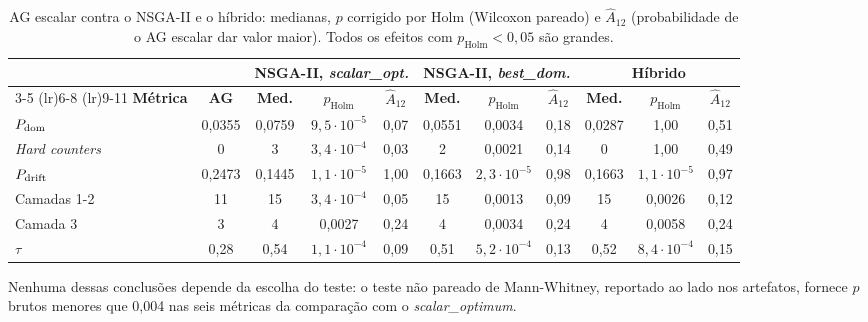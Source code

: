 \begin{table}[htb]
    \caption[AG escalar contra o NSGA-II e o híbrido]{AG escalar contra o NSGA-II e o híbrido: medianas, $p$ corrigido por Holm (Wilcoxon pareado) e $\hat{A}_{12}$ (probabilidade de o AG escalar dar valor maior). Todos os efeitos com $p_{\mathrm{Holm}} < 0{,}05$ são grandes.}
    \label{tab: comparacoes}
    \centering
    \footnotesize
    \setlength{\tabcolsep}{4pt}
    \begin{tabular}{l c ccc ccc ccc}
        \toprule
        & & \multicolumn{3}{c}{\textbf{NSGA-II, \textit{scalar\_opt.}}} & \multicolumn{3}{c}{\textbf{NSGA-II, \textit{best\_dom.}}} & \multicolumn{3}{c}{\textbf{Híbrido}} \\
        \cmidrule(lr){3-5} \cmidrule(lr){6-8} \cmidrule(lr){9-11}
        \textbf{Métrica} & \textbf{AG} & \textbf{Med.} & $p_{\mathrm{Holm}}$ & $\hat{A}_{12}$ & \textbf{Med.} & $p_{\mathrm{Holm}}$ & $\hat{A}_{12}$ & \textbf{Med.} & $p_{\mathrm{Holm}}$ & $\hat{A}_{12}$ \\
        \midrule
        $P_{\mathrm{dom}}$                & 0,0355 & 0,0759 & $9{,}5\cdot10^{-5}$ & 0,07 & 0,0551 & 0,0034              & 0,18 & 0,0287 & 1,00                & 0,51 \\
        \textit{Hard counters} & 0      & 3      & $3{,}4\cdot10^{-4}$ & 0,03 & 2      & 0,0021              & 0,14 & 0      & 1,00                & 0,49 \\
        $P_{\mathrm{drift}}$              & 0,2473 & 0,1445 & $1{,}1\cdot10^{-5}$ & 1,00 & 0,1663 & $2{,}3\cdot10^{-5}$ & 0,98 & 0,1663 & $1{,}1\cdot10^{-5}$ & 0,97 \\
        Camadas 1-2            & 11     & 15     & $3{,}4\cdot10^{-4}$ & 0,05 & 15     & 0,0013              & 0,09 & 15     & 0,0026              & 0,12 \\
        Camada 3               & 3      & 4      & 0,0027              & 0,24 & 4      & 0,0034              & 0,24 & 4      & 0,0058              & 0,24 \\
        $\tau$                 & 0,28   & 0,54   & $1{,}1\cdot10^{-4}$ & 0,09 & 0,51   & $5{,}2\cdot10^{-4}$ & 0,13 & 0,52   & $8{,}4\cdot10^{-4}$ & 0,15 \\
        \bottomrule
    \end{tabular}
    \source
\end{table}

Nenhuma dessas conclusões depende da escolha do teste: o teste não pareado de Mann-Whitney, reportado ao lado nos artefatos, fornece $p$ brutos menores que 0,004 nas seis métricas da comparação com o \textit{scalar\_optimum}.


